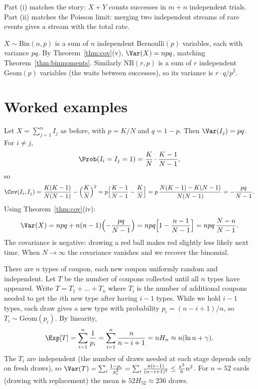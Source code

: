 Part (i) matches the story: $X+Y$ counts successes in $m+n$ independent trials.
Part (ii) matches the Poisson limit: merging two independent streams of rare events
gives a stream with the total rate.

\begin{example}
$X\sim\mathrm{Bin}(n,p)$ is a sum of $n$ independent Bernoulli$(p)$ variables, each
with variance $pq$. By Theorem~\ref{thm:cov}(v), $\Var(X)=npq$, matching
Theorem~\ref{thm:binmoments}. Similarly $\mathrm{NB}(r,p)$ is a sum of $r$
independent Geom$(p)$ variables (the waits between successes), so its variance
is $r\cdot q/p^2$.
\end{example}

\section{Worked examples}

\begin{example}\label{ex:hypervar}
Let $X=\sum_{j=1}^nI_j$ as before, with $p=K/N$ and $q=1-p$. Then
$\Var(I_j)=pq$. For $i\ne j$,
\[
\Prob(I_i=I_j=1)=\frac KN\cdot\frac{K-1}{N-1},
\]
so
\[
\Cov(I_i,I_j)=\frac{K(K-1)}{N(N-1)}-\Bigl(\frac KN\Bigr)^2
=p\Bigl[\frac{K-1}{N-1}-\frac KN\Bigr]=p\,\frac{N(K-1)-K(N-1)}{N(N-1)}
=-\frac{pq}{N-1}.
\]
Using Theorem~\ref{thm:cov}(iv):
\[
\Var(X)=npq+n(n-1)\Bigl(-\frac{pq}{N-1}\Bigr)=npq\Bigl[1-\frac{n-1}{N-1}\Bigr]
=npq\,\frac{N-n}{N-1}.
\]
The covariance is negative: drawing a red ball makes red slightly less likely
next time. When $N\to\infty$ the covariance vanishes and we recover the binomial.
\end{example}

\begin{example}\label{ex:coupon}
There are $n$ types of coupon, each new coupon uniformly random and independent.
Let $T$ be the number of coupons collected until all $n$ types have appeared. Write
$T=T_1+\dots+T_n$ where $T_i$ is the number of additional coupons needed to
get the $i$th new type after having $i-1$ types. While we hold $i-1$ types, each
draw gives a new type with probability $p_i=(n-i+1)/n$, so $T_i\sim\mathrm{Geom}(p_i)$.
By linearity,
\[
\Exp[T]=\sum_{i=1}^n\frac1{p_i}=\sum_{i=1}^n\frac n{n-i+1}=nH_n\approx n(\ln n+\gamma).
\]
The $T_i$ are independent (the number of draws needed at each stage depends only
on fresh draws), so
$\Var(T)=\sum_i\frac{1-p_i}{p_i^2}=\sum_i\frac{n(i-1)}{(n-i+1)^2}\le\frac{\pi^2}6n^2$.
For $n=52$ cards (drawing with replacement) the mean is
$52H_{52}\approx236$ draws.
\end{example}

